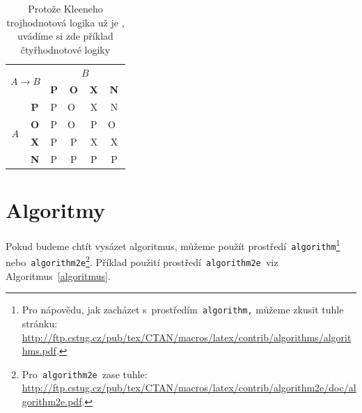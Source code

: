 \documentclass[a4paper, 11pt]{article}
\begin{document}
\begin{table}[ht]
            \begin{tabular}{|c|c|c|c|c|c|}
                \hline
                \multicolumn{2}{|c|}{\multirow{2}{*}{$A\rightarrow B$}} & \multicolumn{4}{c|}{$B$} \\
                \cline{3-6}
                \multicolumn{2}{|c|}{} & \textbf{P} & \textbf{O} & \textbf{X} & \textbf{N} \\
                \hline
                \multirow{4}{*}{$A$} & \textbf{P} & P & O~& X & N \\
                \cline{2-6} & \textbf{O} & P & O~& P & O~\\
                \cline{2-6} & \textbf{X} & P & P & X & X \\
                \cline{2-6} & \textbf{N} & P & P & P & P \\
                \hline
            \end{tabular}
            \caption{Protože Kleeneho trojhodnotová logika už je , uvádíme si zde příklad čtyřhodnotové logiky}
        \end{table}

        \bigskip

\section{Algoritmy} \label{algoritmy}
    Pokud budeme chtít vysázet algoritmus, můžeme použít prostředí\texttt{ algorithm}\footnote{Pro nápovědu, jak zacházet s~prostředím\texttt{ algorithm,} můžeme zkusit tuhle stránku:\\ \href{http://ftp.cstug.cz/pub/tex/CTAN/macros/latex/contrib/algorithms/algorithms.pdf}{http://ftp.cstug.cz/pub/tex/CTAN/macros/latex/contrib/algorithms/algorithms.pdf}.}\texttt{ } nebo\texttt{ algorithm2e}\footnote{Pro\texttt{ algorithm2e }zase tuhle: \href{http://ftp.cstug.cz/pub/tex/CTAN/macros/latex/contrib/algorithm2e/doc/algorithm2e.pdf}{http://ftp.cstug.cz/pub/tex/CTAN/macros/latex/contrib/algorithm2e/doc/algorithm2e.pdf}.}.
    Příklad použití prostředí\texttt{ algorithm2e }viz Algoritmus~\ref{algoritmus}.

    \bigskip
\end{document}
